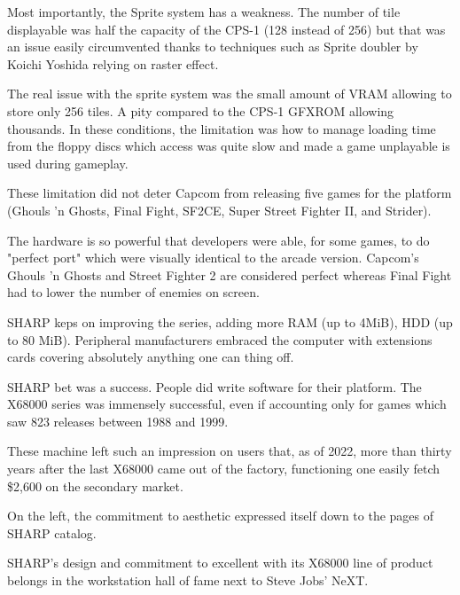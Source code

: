 Most importantly, the Sprite system has a weakness. The number of tile displayable was half the capacity of the CPS-1 (128 instead of 256) but that was an issue easily circumvented thanks to techniques such as Sprite doubler by Koichi Yoshida\cite{x68000spritedoubler} relying on raster effect.

The real issue with the sprite system was the small amount of VRAM allowing to store only 256 tiles. A pity compared to the CPS-1 GFXROM allowing thousands. In these conditions, the limitation was how to manage loading time from the floppy discs which access was quite slow and made a game unplayable is used during gameplay.

\pagebreak

These limitation did not deter Capcom from releasing five games for the platform (Ghouls 'n Ghosts, Final Fight, SF2CE, Super Street Fighter II, and Strider). 

The hardware is so powerful that developers were able, for some games, to do "perfect port" which were visually identical to the arcade version. Capcom's Ghouls 'n Ghosts and Street Fighter 2 are considered perfect whereas Final Fight had to lower the number of enemies on screen.

 SHARP keps on improving the series, adding more RAM (up to 4MiB), HDD (up to 80 MiB). Peripheral manufacturers embraced the computer with extensions cards covering absolutely anything one can thing off. 

 SHARP bet was a success. People did write software for their platform. The X68000 series was immensely successful, even if accounting only for games which saw 823 releases between 1988 and 1999.


These machine left such an impression on users that, as of 2022, more than thirty years after the last X68000 came out of the factory, functioning one easily fetch \$2,600 on the secondary market.


On the left, the commitment to aesthetic expressed itself down to the pages of SHARP catalog. 

SHARP's design and commitment to excellent with its X68000 line of product belongs in the workstation hall of fame next to Steve Jobs' NeXT.